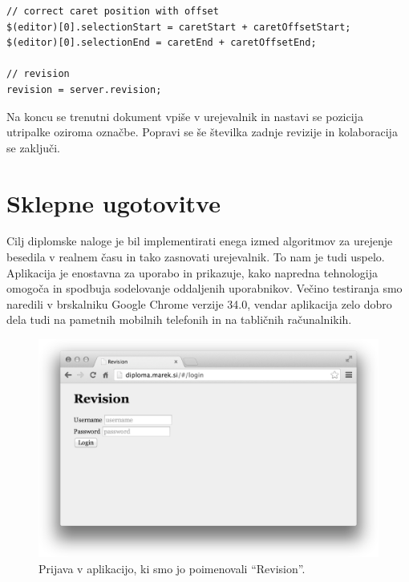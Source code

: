 \documentclass[a4paper, 12pt, twoside]{book}
\begin{document}
\begin{lstlisting}[title={Koda 6.6: Popravljanje pozicije utripalke na strani odjemalca.}]
// correct caret position with offset
$(editor)[0].selectionStart = caretStart + caretOffsetStart;
$(editor)[0].selectionEnd = caretEnd + caretOffsetEnd;

// revision
revision = server.revision;
\end{lstlisting}

Na koncu se trenutni dokument vpiše v urejevalnik in nastavi se pozicija utripalke oziroma označbe. Popravi se še številka zadnje revizije in kolaboracija se zaključi.


\chapter{Sklepne ugotovitve}

Cilj diplomske naloge je bil implementirati enega izmed algoritmov za urejenje besedila v realnem času in tako zasnovati urejevalnik. To nam je tudi uspelo. Aplikacija je enostavna za uporabo in prikazuje, kako napredna tehnologija omogoča in spodbuja sodelovanje oddaljenih uporabnikov. Večino testiranja smo naredili v brskalniku Google Chrome verzije 34.0, vendar aplikacija zelo dobro dela tudi na pametnih mobilnih telefonih in na tabličnih računalnikih.

\begin{figure}[placement h]
\begin{center}
\includegraphics[width=14cm]{revision-login.png}
\end{center}
\caption{Prijava v aplikacijo, ki smo jo poimenovali “Revision”.}
\label{rev-lgn}
\end{figure}

\pagebreak
\end{document}
